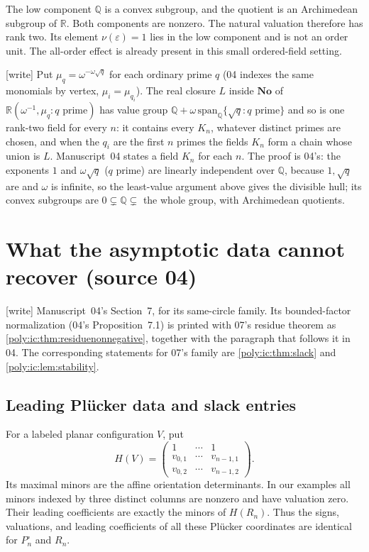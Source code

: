 \documentclass[11pt,a4paper]{article}
\numberwithin{equation}{section}
\theoremstyle{plain}
\newcommand{\wtag}{\textup{[write]}}%
\newcommand{\No}{\mathbf{No}}
\newcommand{\R}{\mathbb R}
\newcommand{\Q}{\mathbb Q}
\newcommand{\eps}{\varepsilon}
\begin{document}
The low component $\Q$ is a convex subgroup, and the quotient is an
Archimedean subgroup of $\R$. Both components are nonzero. The natural
valuation therefore has rank two. Its element $\nu(\eps)=1$ lies in the
low component and is not an order unit. The all-order effect is already
present in this small ordered-field setting.

\begin{remark}\label{poly:bao:rem:onefield}
\wtag{} Put $\mu_q=\omega^{-\omega\sqrt q}$ for each ordinary prime $q$
(04 indexes the same monomials by vertex, $\mu_i=\mu_{q_i}$). The real
closure $L$ inside $\No$ of $\R(\omega^{-1},\mu_q:q\text{ prime})$ has
value group $\Q+\omega\,\mathrm{span}_\Q\{\sqrt q:q\text{ prime}\}$ and so
is one rank-two field for every $n$: it contains every $K_n$, whatever
distinct primes are chosen, and when the $q_i$ are the first $n$ primes the
fields $K_n$ form a chain whose union is $L$. Manuscript~04 states a field
$K_n$ for each $n$. The proof is 04's: the exponents $1$ and
$\omega\sqrt q$ ($q$ prime) are linearly independent over $\Q$, because
$1,\sqrt q$ are and $\omega$ is infinite, so the least-value argument above
gives the divisible hull; its convex subgroups are $0\subsetneq\Q\subsetneq$
the whole group, with Archimedean quotients.
\end{remark}

\section{What the asymptotic data cannot recover (source 04)}\label{poly:bao:sec:invisible}

\wtag{} Manuscript~04's Section~7, for its same-circle family. Its
bounded-factor normalization (04's Proposition~7.1) is printed with 07's
residue theorem as \cref{poly:ic:thm:residuenonnegative}, together with the
paragraph that follows it in 04. The corresponding statements for 07's
family are \cref{poly:ic:thm:slack} and \cref{poly:ic:lem:stability}.

\subsection{Leading Pl\"ucker data and slack entries}
For a labeled planar configuration $V$, put
\[
 H(V)=\begin{pmatrix}
 1&\cdots&1\\
 v_{0,1}&\cdots&v_{n-1,1}\\
 v_{0,2}&\cdots&v_{n-1,2}
 \end{pmatrix}.
\]
Its maximal minors are the affine orientation determinants. In our
examples all minors indexed by three distinct columns are nonzero and
have valuation zero. Their leading coefficients are exactly the minors
of $H(R_n)$. Thus the signs, valuations, and leading coefficients of all
these Pl\"ucker coordinates are identical for $P^\circ_n$ and $R_n$.
\end{document}
